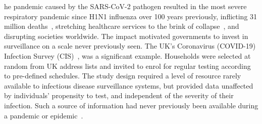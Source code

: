 \documentclass[9pt,twocolumn,twoside]{pnas-new}
\makeatletter
\DeclareRobustCommand\onedot{\futurelet\@let@token\@onedot}
\def\@onedot{\ifx\@let@token.\else.\null\fi\xspace}
\def\eg{e.g\onedot} \def\Eg{{E.g}\onedot}
\makeatother
\begin{document}
\maketitle
\thispagestyle{firststyle}




he pandemic caused by the SARS-CoV-2 pathogen resulted in the most severe respiratory pandemic since H1N1 influenza over 100 years previously,
inflicting 31 million deaths~\citep{whoCOVIDExcess,economistCOVIDExcess}, stretching healthcare services to the brink of collapse~\citep{fongNHS}, and disrupting societies worldwide.
The impact motivated governments to invest in surveillance on a scale never previously seen. The UK's Coronavirus (COVID-19) Infection Survey (CIS)~\citep{cisMethodsONS,CIS}, was a significant example.
Households were selected at random from UK address lists and invited to enrol for regular testing according to pre-defined schedules.
The study design required a level of resource rarely available to infectious disease surveillance systems, but provided data 
unaffected by individuals' propensity to test, and independent of the severity of their infection. Such a  source of information had never previously been available during a pandemic or epidemic~\citep{shadboltChallenges}.
\end{document}
